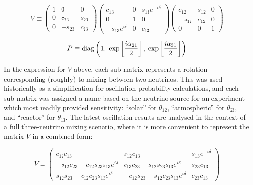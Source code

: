 \begin{equation}\label{eqn:pmns-matrix_split}
V \equiv \left( \begin{array}{ccc} 1& 0 & 0 \\ 0 & c_{23} & s_{23} \\ 0 & -s_{23} & c_{23} \end{array}\right)
\left( \begin{array}{ccc} c_{13} & 0 & s_{13}e^{-i\delta} \\ 0 & 1 & 0 \\ -s_{13}e^{i\delta} & 0 & c_{13} \end{array} \right)
\left( \begin{array}{ccc} c_{12} & s_{12} & 0 \\ -s_{12} & c_{12} & 0 \\ 0 & 0 & 1 \end{array} \right)
\end{equation}

\begin{equation}\label{eqn:majorana-matrix}
P \equiv \mathrm{diag} \left( 1, ~ \exp\left[\frac{i\alpha_{21}}{2}\right], ~ \exp\left[\frac{i\alpha_{31}}{2}\right] \right)
\end{equation}

In the expression for $V$ above, each sub-matrix represents a rotation corresponding (roughly) to mixing between two neutrinos. This was used historically as a simplification for oscillation probability calculations, and each sub-matrix was assigned a name based on the neutrino source for an experiment which most readily provided sensitivity: ``solar'' for $\theta_{12}$, ``atmospheric'' for $\theta_{23}$, and ``reactor'' for $\theta_{13}$. The latest oscillation results are analysed in the context of a full three-neutrino mixing scenario, where it is more convenient to represent the matrix $V$ in a combined form:

\begin{equation}\label{eqn:pmns_matrix_combined}
V \equiv \left( \begin{array}{ccc}
 c_{12}c_{13} & s_{12}c_{13} & s_{13}e^{-i\delta} \\
 -s_{12}c_{23} - c_{12}s_{23}s_{13}e^{i\delta} & c_{13}c_{23} - s_{12}s_{23}s_{13}e^{i\delta} & s_{23}c_{13} \\
 s_{12}s_{23} - c_{12}c_{23}s_{13}e^{i\delta} & -c_{12}s_{23} - s_{12}c_{23}s_{13}e^{i\delta} & c_{23}c_{13}
 \end{array}
\right)
\end{equation}

